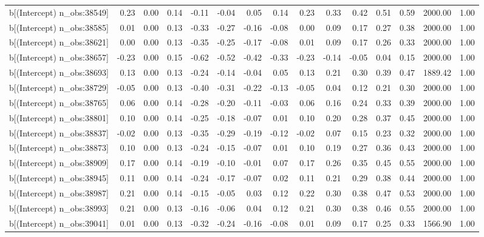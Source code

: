 \begin{table}[ht]
\begin{tabular}{rrrrrrrrrrrrrrr}
  b[(Intercept) n\_obs:38549] & 0.23 & 0.00 & 0.14 & -0.11 & -0.04 & 0.05 & 0.14 & 0.23 & 0.33 & 0.42 & 0.51 & 0.59 & 2000.00 & 1.00 \\ 
  b[(Intercept) n\_obs:38585] & 0.01 & 0.00 & 0.13 & -0.33 & -0.27 & -0.16 & -0.08 & 0.00 & 0.09 & 0.17 & 0.27 & 0.38 & 2000.00 & 1.00 \\ 
  b[(Intercept) n\_obs:38621] & 0.00 & 0.00 & 0.13 & -0.35 & -0.25 & -0.17 & -0.08 & 0.01 & 0.09 & 0.17 & 0.26 & 0.33 & 2000.00 & 1.00 \\ 
  b[(Intercept) n\_obs:38657] & -0.23 & 0.00 & 0.15 & -0.62 & -0.52 & -0.42 & -0.33 & -0.23 & -0.14 & -0.05 & 0.04 & 0.15 & 2000.00 & 1.00 \\ 
  b[(Intercept) n\_obs:38693] & 0.13 & 0.00 & 0.13 & -0.24 & -0.14 & -0.04 & 0.05 & 0.13 & 0.21 & 0.30 & 0.39 & 0.47 & 1889.42 & 1.00 \\ 
  b[(Intercept) n\_obs:38729] & -0.05 & 0.00 & 0.13 & -0.40 & -0.31 & -0.22 & -0.13 & -0.05 & 0.04 & 0.12 & 0.21 & 0.30 & 2000.00 & 1.00 \\ 
  b[(Intercept) n\_obs:38765] & 0.06 & 0.00 & 0.14 & -0.28 & -0.20 & -0.11 & -0.03 & 0.06 & 0.16 & 0.24 & 0.33 & 0.39 & 2000.00 & 1.00 \\ 
  b[(Intercept) n\_obs:38801] & 0.10 & 0.00 & 0.14 & -0.25 & -0.18 & -0.07 & 0.01 & 0.10 & 0.20 & 0.28 & 0.37 & 0.45 & 2000.00 & 1.00 \\ 
  b[(Intercept) n\_obs:38837] & -0.02 & 0.00 & 0.13 & -0.35 & -0.29 & -0.19 & -0.12 & -0.02 & 0.07 & 0.15 & 0.23 & 0.32 & 2000.00 & 1.00 \\ 
  b[(Intercept) n\_obs:38873] & 0.10 & 0.00 & 0.13 & -0.24 & -0.15 & -0.07 & 0.01 & 0.10 & 0.19 & 0.27 & 0.36 & 0.43 & 2000.00 & 1.00 \\ 
  b[(Intercept) n\_obs:38909] & 0.17 & 0.00 & 0.14 & -0.19 & -0.10 & -0.01 & 0.07 & 0.17 & 0.26 & 0.35 & 0.45 & 0.55 & 2000.00 & 1.00 \\ 
  b[(Intercept) n\_obs:38945] & 0.11 & 0.00 & 0.14 & -0.24 & -0.17 & -0.07 & 0.02 & 0.11 & 0.21 & 0.29 & 0.38 & 0.44 & 2000.00 & 1.00 \\ 
  b[(Intercept) n\_obs:38987] & 0.21 & 0.00 & 0.14 & -0.15 & -0.05 & 0.03 & 0.12 & 0.22 & 0.30 & 0.38 & 0.47 & 0.53 & 2000.00 & 1.00 \\ 
  b[(Intercept) n\_obs:38993] & 0.21 & 0.00 & 0.13 & -0.16 & -0.06 & 0.04 & 0.12 & 0.21 & 0.30 & 0.38 & 0.46 & 0.55 & 2000.00 & 1.00 \\ 
  b[(Intercept) n\_obs:39041] & 0.01 & 0.00 & 0.13 & -0.32 & -0.24 & -0.16 & -0.08 & 0.01 & 0.09 & 0.17 & 0.25 & 0.33 & 1566.90 & 1.00 \\ 

\end{tabular}
\end{table}
